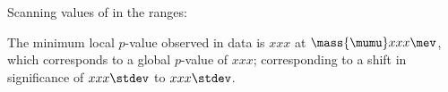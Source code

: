 Scanning values of  in the ranges:

The minimum local $p$-value observed in data is $xxx$  at $\mass{\mumu}xxx\mev$,
which corresponds to a global $p$-value of $xxx$; corresponding to a shift in significance of
$xxx\stdev$ to $xxx\stdev$.












